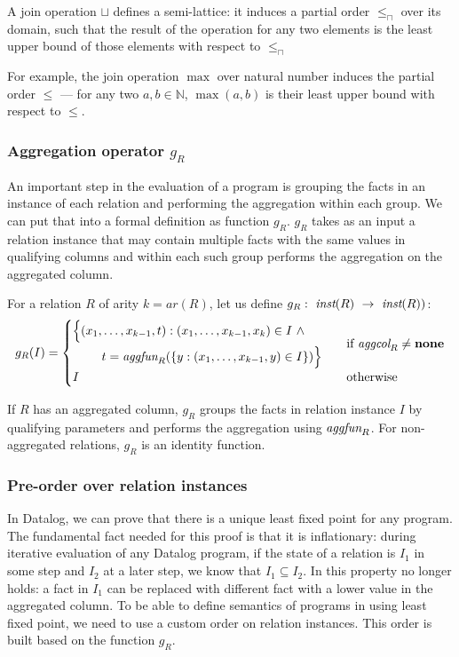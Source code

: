 A join operation $\sqcup$ defines a semi-lattice: it induces a partial order $\le_\sqcap$ over its domain, such that the result of the operation for any two elements is the least upper bound of those elements with respect to $\le_\sqcap$

For example, the join operation $\max$ over natural number induces the partial order $\le$ --- for any two $a, b \in \mathbb{N}$, $\max(a, b)$ is their least upper bound with respect to $\le$.

\subsubsection{Aggregation operator $g_R$}
An important step in the evaluation of a \datalogra program is grouping the facts in an instance of each relation and performing the aggregation within each group. We can put that into a formal definition as function $g_R$. $g_R$ takes as an input a relation instance that may contain multiple facts with the same values in  qualifying columns and within each such group performs the aggregation on the aggregated column.
\begin{defn}\label{d:aggregationoperationgr}
For a relation $R$ of arity $k = ar(R)$, let us define $g_R:~\textit{inst}(R)~\to~\textit{inst}(R))$:
$$
g_R(I) = \begin{cases}
\!\begin{aligned}%
       \Big\{(x_1, &\dots, x_{k-1}, t): (x_1, \dots, x_{k-1}, x_k) \in I~\wedge & \\
           &t = \aggfun_R(\{y: (x_1, \dots, x_{k-1}, y) \in I\})\Big\}&
    \end{aligned}          & \text{if } \aggcol_R \ne \bf{none} \\
I                          & \text{otherwise}
\end{cases}
$$
\end{defn}

If $R$ has an aggregated column, $g_R$ groups the facts in relation instance $I$ by qualifying parameters and performs the aggregation using $\textit{aggfun}_R$. For non-aggregated relations, $g_R$ is an identity function.

\subsubsection{Pre-order over relation instances}
In Datalog, we can prove that there is a unique least fixed point for any program. The fundamental fact needed for this proof is that it is inflationary: during iterative evaluation of any Datalog program, if the state of a relation is $I_1$ in some step and $I_2$ at a later step, we know that $I_1 \subseteq I_2$. In \datalogra this property no longer holds: a fact in $I_1$ can be replaced with different fact with a lower value in the aggregated column. To be able to define semantics of programs in \datalogra using least fixed point, we need to use a custom order on relation instances. This order is built based on the function $g_R$.

